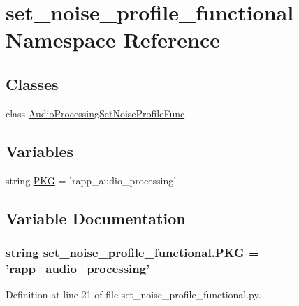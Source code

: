 \hypertarget{namespaceset__noise__profile__functional}{\section{set\-\_\-noise\-\_\-profile\-\_\-functional Namespace Reference}
\label{namespaceset__noise__profile__functional}
}
\subsection*{Classes}
\begin{DoxyCompactItemize}
\item 
class \hyperlink{classset__noise__profile__functional_1_1AudioProcessingSetNoiseProfileFunc}{Audio\-Processing\-Set\-Noise\-Profile\-Func}
\end{DoxyCompactItemize}
\subsection*{Variables}
\begin{DoxyCompactItemize}
\item 
string \hyperlink{namespaceset__noise__profile__functional_a64d0c027fd838c4894c939889f000505}{P\-K\-G} = 'rapp\-\_\-audio\-\_\-processing'
\end{DoxyCompactItemize}


\subsection{Variable Documentation}
\hypertarget{namespaceset__noise__profile__functional_a64d0c027fd838c4894c939889f000505}{
\subsubsection[{P\-K\-G}]{\setlength{\rightskip}{0pt plus 5cm}string set\-\_\-noise\-\_\-profile\-\_\-functional.\-P\-K\-G = 'rapp\-\_\-audio\-\_\-processing'}}\label{namespaceset__noise__profile__functional_a64d0c027fd838c4894c939889f000505}


Definition at line 21 of file set\-\_\-noise\-\_\-profile\-\_\-functional.\-py.


